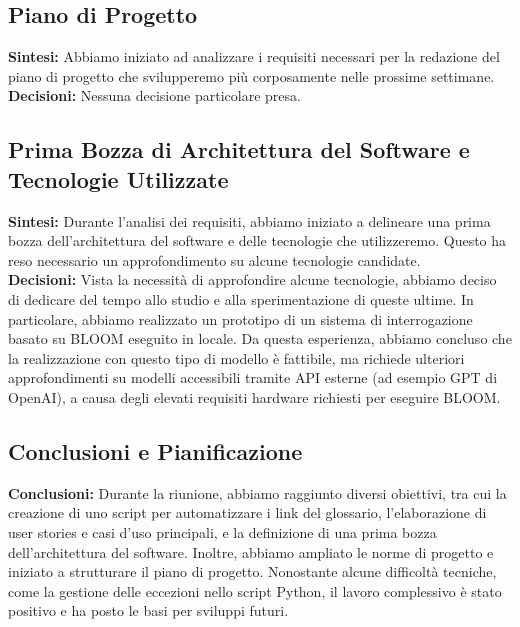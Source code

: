 \documentclass{article}
\begin{document}
    \subsection{Piano di Progetto}
    \textbf{Sintesi:} Abbiamo iniziato ad analizzare i requisiti necessari per la redazione del piano di progetto che svilupperemo più corposamente nelle prossime settimane. \\
    \textbf{Decisioni:} Nessuna decisione particolare presa.

    \subsection{Prima Bozza di Architettura del Software e Tecnologie Utilizzate}
    \textbf{Sintesi:} Durante l'analisi dei requisiti, abbiamo iniziato a delineare una prima bozza dell'architettura del software e delle tecnologie che utilizzeremo. Questo ha reso necessario un approfondimento su alcune tecnologie candidate. \\
    \textbf{Decisioni:} Vista la necessità di approfondire alcune tecnologie, abbiamo deciso di dedicare del tempo allo studio e alla sperimentazione di queste ultime. In particolare, abbiamo realizzato un prototipo di un sistema di interrogazione basato su BLOOM eseguito in locale. Da questa esperienza, abbiamo concluso che la realizzazione con questo tipo di modello è fattibile, ma richiede ulteriori approfondimenti su modelli accessibili tramite API esterne (ad esempio GPT di OpenAI), a causa degli elevati requisiti hardware richiesti per eseguire BLOOM.
    

    \subsection*{Conclusioni e Pianificazione} 
    \textbf{Conclusioni:} Durante la riunione, abbiamo raggiunto diversi obiettivi, tra cui la creazione di uno script per automatizzare i link del glossario, l'elaborazione di user stories e casi d'uso principali, e la definizione di una prima bozza dell'architettura del software. Inoltre, abbiamo ampliato le norme di progetto e iniziato a strutturare il piano di progetto. Nonostante alcune difficoltà tecniche, come la gestione delle eccezioni nello script Python, il lavoro complessivo è stato positivo e ha posto le basi per sviluppi futuri.
\end{document}
